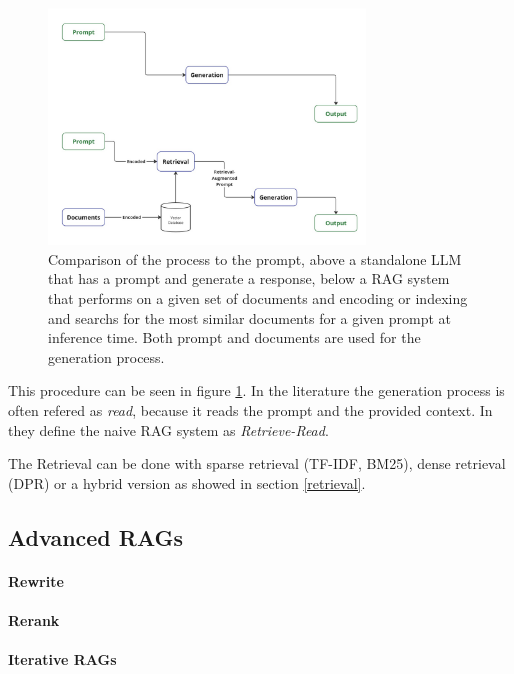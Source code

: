 \begin{figure}[h!]
    \centering
    \includegraphics[width=0.75\textwidth]{images/LLM-vs-RAG.jpg}
    \caption{Comparison of the process to the prompt, above a standalone LLM that has a prompt and generate a response, below a RAG system that performs on a given set of documents and encoding or indexing and searchs for the most similar documents for a given prompt at inference time. Both prompt and documents are used for the generation process.}
    \label{fig:naive_rag}
\end{figure}

This procedure can be seen in figure \ref{fig:naive_rag}. In the literature the generation process is often refered as \textit{read}, because it reads the prompt and the provided context. In \cite{Gao.18.12.2023} they define the naive RAG system as \textit{Retrieve-Read}. 

The Retrieval can be done with sparse retrieval (TF-IDF, BM25), dense retrieval (DPR) or a hybrid version as showed in section \ref{retrieval}. 

\subsection{Advanced RAGs}
\label{sec:advanced_rags}

\paragraph{Rewrite}
\label{sec:rewrite}

\paragraph{Rerank}
\label{sec:rerank}

\paragraph{Iterative RAGs}
\label{sec:iterative}

